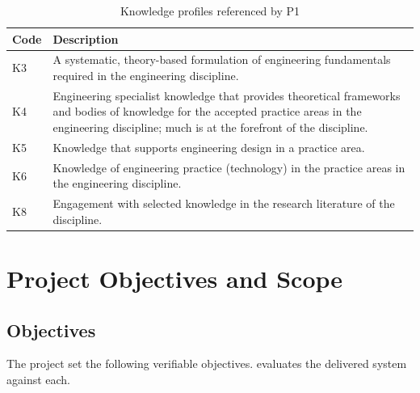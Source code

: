 \begin{table}[htbp]
  \centering
  \caption{Knowledge profiles referenced by P1}
  \label{tab:knowledge-profile}
  \begin{tabularx}{\textwidth}{lY}
    \toprule
    Code & Description \\
    \midrule
    K3 & A systematic, theory-based formulation of engineering fundamentals required in the engineering discipline. \\
    K4 & Engineering specialist knowledge that provides theoretical frameworks and bodies of knowledge for the accepted practice areas in the engineering discipline; much is at the forefront of the discipline. \\
    K5 & Knowledge that supports engineering design in a practice area. \\
    K6 & Knowledge of engineering practice (technology) in the practice areas in the engineering discipline. \\
    K8 & Engagement with selected knowledge in the research literature of the discipline. \\
    \bottomrule
  \end{tabularx}
\end{table}

\section{Project Objectives and Scope}
\label{sec:objectives}

\subsection{Objectives}

The project set the following verifiable objectives. 
evaluates the delivered system against each.

